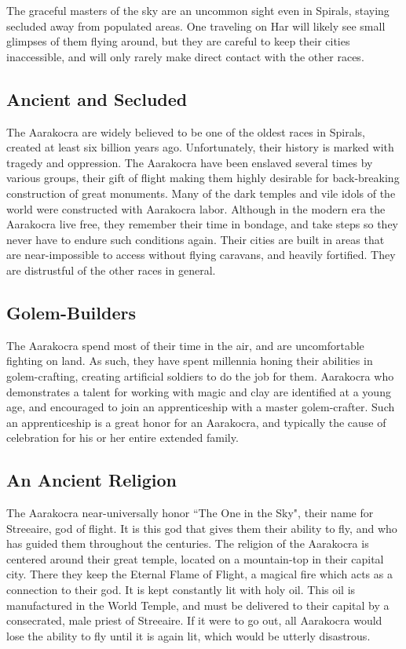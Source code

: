 The graceful masters of the sky are an uncommon sight even in Spirals, staying secluded away from populated areas.
One traveling on Har will likely see small glimpses of them flying around, but they are careful to keep their cities inaccessible, and will only rarely make direct contact with the other races.

\subsection{Ancient and Secluded}
The Aarakocra are widely believed to be one of the oldest races in Spirals, created at least six billion years ago.
Unfortunately, their history is marked with tragedy and oppression.
The Aarakocra have been enslaved several times by various groups, their gift of flight making them highly desirable for back-breaking construction of great monuments.
Many of the dark temples and vile idols of the world were constructed with Aarakocra labor.
Although in the modern era the Aarakocra live free, they remember their time in bondage, and take steps so they never have to endure such conditions again.
Their cities are built in areas that are near-impossible to access without flying caravans, and heavily fortified.
They are distrustful of the other races in general.

\subsection{Golem-Builders}
The Aarakocra spend most of their time in the air, and are uncomfortable fighting on land.
As such, they have spent millennia honing their abilities in golem-crafting, creating artificial soldiers to do the job for them.
Aarakocra who demonstrates a talent for working with magic and clay are identified at a young age, and encouraged to join an apprenticeship with a master golem-crafter.
Such an apprenticeship is a great honor for an Aarakocra, and typically the cause of celebration for his or her entire extended family.

\subsection{An Ancient Religion}
The Aarakocra near-universally honor ``The One in the Sky", their name for Streeaire, god of flight.
It is this god that gives them their ability to fly, and who has guided them throughout the centuries.
The religion of the Aarakocra is centered around their great temple, located on a mountain-top in their capital city.
There they keep the Eternal Flame of Flight, a magical fire which acts as a connection to their god.
It is kept constantly lit with holy oil.
This oil is manufactured in the World Temple, and must be delivered to their capital by a consecrated, male priest of Streeaire.
If it were to go out, all Aarakocra would lose the ability to fly until it is again lit, which would be utterly disastrous.


